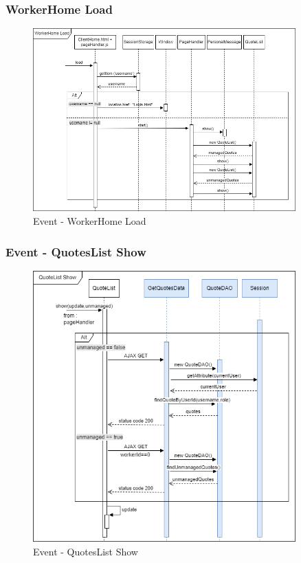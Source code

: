 \documentclass[a4paper, 12pt]{article}
\begin{document}
\subsubsection{WorkerHome Load}
\begin{figure}[h!]
	\centering
	\includegraphics[width=0.9\textwidth]{RIA_images/WorkerHomeLoad.png}
	\caption{Event - WorkerHome Load}
	\label{figure:WorkerHomeLoadRIA}
\end{figure}
\newpage
\subsubsection{Event - QuotesList Show}
\begin{figure}[h!]
	\centering
	\includegraphics[width=0.9\textwidth]{RIA_images/QuoteListShow.png}
	\caption{Event - QuotesList Show}
	\label{figure:QuotesListShowRIA}
\end{figure}
\newpage
\end{document}
